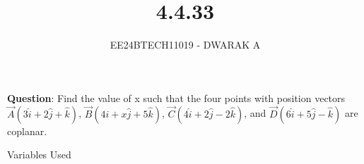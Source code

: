 \documentclass[journal]{IEEEtran}
\begin{document}

\vspace{3cm}

\title{4.4.33}
\author{EE24BTECH11019 - DWARAK A}
{\let\newpage\relax\maketitle}

\renewcommand{\thefigure}{\theenumi}
\renewcommand{\thetable}{\theenumi}
\setlength{\intextsep}{10pt} %


\renewcommand{\thetable}{\theenumi}


\textbf{Question}:
Find the value of x such that the four points with position vectors $\vec{A}(3\hat{i}+2\hat{j}+\hat{k})$, $\vec{B}(4\hat{i}+x\hat{j}+5\hat{k})$, $\vec{C}(4\hat{i}+2\hat{j}-2\hat{k})$, and $\vec{D}(6\hat{i}+5\hat{j}-\hat{k})$ are coplanar.

\solution

\begin{table}[h!]    
  \centering
  
  \caption{Variables Used}
  \label{tab4.4.33.1}
\end{table}
\end{document}
